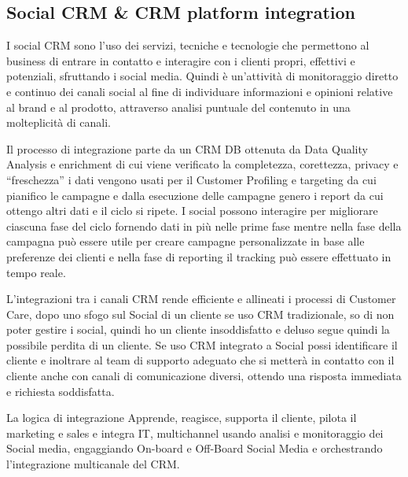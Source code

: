 \documentclass[11pt]{article}
\begin{document}
\subsection{Social CRM \& CRM platform integration}
I social CRM sono l'uso dei servizi, tecniche e tecnologie che permettono al business di entrare in contatto e interagire con i clienti propri, effettivi e potenziali, sfruttando i social media. Quindi è un'attività di monitoraggio diretto e continuo dei canali social al fine di individuare informazioni e opinioni relative al brand e al prodotto, attraverso analisi puntuale del contenuto in una molteplicità di canali.

Il processo di integrazione parte da un CRM DB ottenuta da Data Quality Analysis e enrichment di cui viene verificato la completezza, corettezza, privacy e ``freschezza'' i dati vengono usati per il Customer Profiling e targeting da cui pianifico le campagne e dalla esecuzione delle campagne genero i report da cui ottengo altri dati e il ciclo si ripete. I social possono interagire per migliorare ciascuna fase del ciclo fornendo dati in più nelle prime fase mentre nella fase della campagna può essere utile per creare campagne personalizzate in base alle preferenze dei clienti e nella fase di reporting il tracking può essere effettuato in tempo reale.

L'integrazioni tra i canali CRM rende efficiente e allineati i processi di Customer Care, dopo uno sfogo sul Social di un cliente se uso CRM tradizionale, so di non poter gestire i social, quindi ho un cliente insoddisfatto e deluso segue quindi la possibile perdita di un cliente. Se uso CRM integrato a Social possi identificare il cliente e inoltrare al team di supporto adeguato che si metterà in contatto con il cliente anche con canali di comunicazione diversi, ottendo una risposta immediata e richiesta soddisfatta.

La logica di integrazione Apprende, reagisce, supporta il cliente, pilota il marketing e sales e integra IT, multichannel usando analisi e monitoraggio dei Social media, engaggiando On-board e Off-Board Social Media e orchestrando l'integrazione multicanale del CRM.
\end{document}
